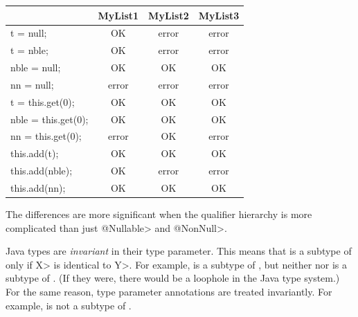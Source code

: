 \begin{tabular}{|l|c|c|c|} \hline
                        & MyList1 & MyList2 & MyList3 \\ \hline
  t = null;             & OK      & error   & error   \\ \hline
  t = nble;             & OK      & error   & error   \\ \hline
  nble = null;          & OK      & OK      & OK      \\ \hline
  nn = null;            & error   & error   & error   \\ \hline
  t = this.get(0);      & OK      & OK      & OK      \\ \hline
  nble = this.get(0);   & OK      & OK      & OK      \\ \hline
  nn = this.get(0);     & error   & OK      & error   \\ \hline
  this.add(t);          & OK      & OK      & OK      \\ \hline
  this.add(nble);       & OK      & error   & error   \\ \hline
  this.add(nn);         & OK      & OK      & OK      \\ \hline
\end{tabular}


The differences are more
significant when the qualifier hierarchy is more complicated than just
\<@Nullable> and \<@NonNull>.


Java types are \emph{invariant} in their type parameter.  This means that
 is a subtype of  only if \<X> is identical to \<Y>.  For
example,  is a subtype of , but
neither  nor  is a subtype of
.  (If they were, there would be a loophole in the Java
type system.)  For the same reason, type parameter annotations are treated
invariantly.  For example,  is not a subtype
of .

